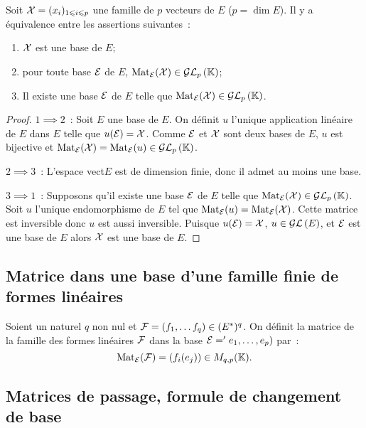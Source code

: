 \begin{theo}
  Soit \(\mathcal{X}=(x_i)_{1 \leqslant i\leqslant p}\) une famille de \(p\) vecteurs 
  de \(E\) (\(p=\dim E\)). Il y a équivalence entre les assertions 
  suivantes~:
  \begin{enumerate}
    \item \(\mathcal{X}\) est une base de \(E\);
    \item pour toute base \(\mathcal{E}\) de \(E\), \(\mathrm{Mat}_{\mathcal{E}}(\mathcal{X}) \in \mathcal{GL}_{p}\left(\mathbb{K}\right)\);
    \item Il existe une base \(\mathcal{E}\) de \(E\) telle que \(\mathrm{Mat}_{\mathcal{E}}(\mathcal{X}) \in 
      \mathcal{GL}_{p}\left(\mathbb{K}\right)\).
  \end{enumerate}
\end{theo}
\begin{proof}
  \(1 \implies 2\)~: Soit \(E\) une base de \(E\). On définit \(u\) l'unique 
  application linéaire de \(E\) dans \(E\) telle que \(u(\mathcal{E})=\mathcal{X}\). Comme 
  \(\mathcal{E}\) et \(\mathcal{X}\) sont deux bases de \(E\), \(u\) est bijective et 
  \(\mathrm{Mat}_{\mathcal{E}}(\mathcal{X})=\mathrm{Mat}_{\mathcal{E}}(u) \in \mathcal{GL}_{p}\left(\mathbb{K}\right)\).

  \(2 \implies 3\)~: L'espace vect\(E\) est de dimension finie, donc il 
  admet au moins une base.

  \(3 \implies 1\)~: Supposons qu'il existe une base \(\mathcal{E}\) de \(E\) telle 
  que \(\mathrm{Mat}_{\mathcal{E}}(\mathcal{X}) \in \mathcal{GL}_{p}\left(\mathbb{K}\right)\). Soit \(u\) l'unique endomorphisme de 
  \(E\) tel que \(\mathrm{Mat}_{\mathcal{E}}(u)=\mathrm{Mat}_{\mathcal{E}}(\mathcal{X})\). Cette matrice est inversible 
  donc \(u\) est aussi inversible. Puisque \(u(\mathcal{E})=\mathcal{X}\), \(u \in \mathcal{GL}\left(E\right)\), 
  et \(\mathcal{E}\) est une base de \(E\) alors \(\mathcal{X}\) est une base de \(E\).
\end{proof}

\subsection{Matrice dans une base d'une famille finie de formes linéaires}

Soient un naturel \(q\) non nul et \(\mathcal{F}=(f_1, \ldots f_q) \in (E^*)^q\). On 
définit la matrice de la famille des formes linéaires \(\mathcal{F}\) dans la base 
\(\mathcal{E}='e_1, \ldots, e_p)\) par~:
\begin{equation}
  \mathrm{Mat}_{\mathcal{E}}(\mathcal{F}) = (f_i(e_j)) \in M_{q,p}(\mathbb{K}).
\end{equation}

\subsection{Matrices de passage, formule de changement de base}

